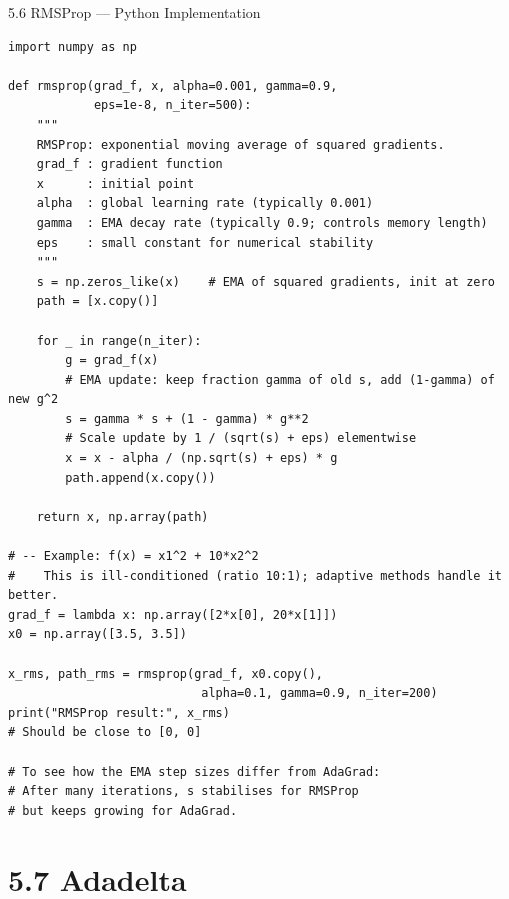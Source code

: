 \documentclass[aspectratio=169,10pt]{beamer}
\begin{document}
\begin{frame}[fragile]{5.6 RMSProp --- Python Implementation}
\begin{lstlisting}[caption={RMSProp (Python/NumPy)}]
import numpy as np

def rmsprop(grad_f, x, alpha=0.001, gamma=0.9,
            eps=1e-8, n_iter=500):
    """
    RMSProp: exponential moving average of squared gradients.
    grad_f : gradient function
    x      : initial point
    alpha  : global learning rate (typically 0.001)
    gamma  : EMA decay rate (typically 0.9; controls memory length)
    eps    : small constant for numerical stability
    """
    s = np.zeros_like(x)    # EMA of squared gradients, init at zero
    path = [x.copy()]

    for _ in range(n_iter):
        g = grad_f(x)
        # EMA update: keep fraction gamma of old s, add (1-gamma) of new g^2
        s = gamma * s + (1 - gamma) * g**2
        # Scale update by 1 / (sqrt(s) + eps) elementwise
        x = x - alpha / (np.sqrt(s) + eps) * g
        path.append(x.copy())

    return x, np.array(path)

# -- Example: f(x) = x1^2 + 10*x2^2
#    This is ill-conditioned (ratio 10:1); adaptive methods handle it better.
grad_f = lambda x: np.array([2*x[0], 20*x[1]])
x0 = np.array([3.5, 3.5])

x_rms, path_rms = rmsprop(grad_f, x0.copy(),
                           alpha=0.1, gamma=0.9, n_iter=200)
print("RMSProp result:", x_rms)
# Should be close to [0, 0]

# To see how the EMA step sizes differ from AdaGrad:
# After many iterations, s stabilises for RMSProp
# but keeps growing for AdaGrad.
\end{lstlisting}
\end{frame}

\section{5.7 Adadelta}
\end{document}
